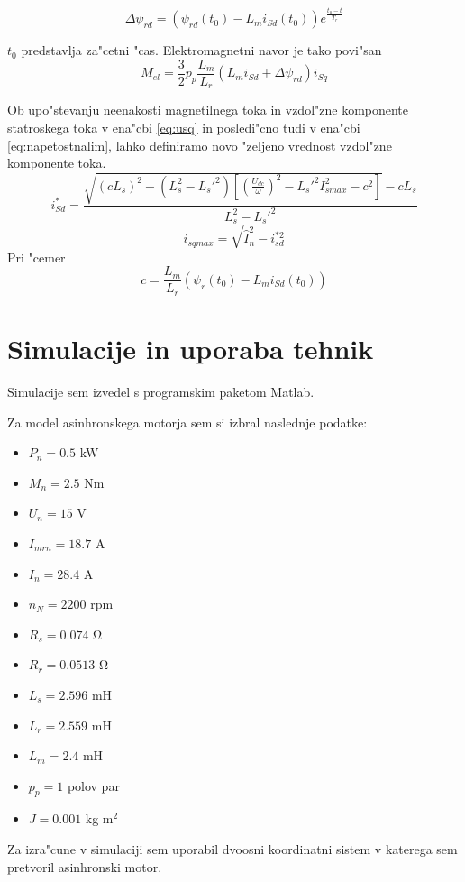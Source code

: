 \documentclass[journal,a4paper,twoside]{sty/IEEEtran}
\begin{document}
 \begin{equation}
\label{eq:delta}
\Delta \psi_{rd}=(\psi_{rd}(t_0)-L_m i_{Sd}(t_0))e^{\frac{t_0-t}{T_r}}
\end{equation}

$t_0$ predstavlja za"cetni "cas. Elektromagnetni navor je tako povi"san
\begin{equation}
\label{navor3}
M_{el}=\frac{3}{2}p_p \frac{L_m}{L_r}(L_m i_{Sd}+\Delta \psi_{rd})i_{Sq}
\end{equation}

Ob upo"stevanju neenakosti magnetilnega toka in vzdol"zne komponente statroskega toka v ena"cbi \ref{eq:usq} in posledi"cno tudi v ena"cbi \ref{eq:napetostnalim}, lahko definiramo novo "zeljeno vrednost vzdol"zne komponente toka.
\begin{equation}
\label{eq:zeljentok2}
i_{Sd}^*=\frac{\sqrt{(c L_s)^2+(L_s^2-L_s'^2)[(\frac{U_{dc}}{\omega})^2-L_s'^2I_{smax}^2-c^2]}-cL_s}{L_s^2-L_s'^2}
\end{equation}
\begin{equation}
i_{sqmax}=\sqrt{\hat{I}_n^2-i_{sd}^{*2}}
\end{equation}
Pri "cemer
$$c=\frac{L_m}{L_r}(\psi_{r}(t_0)-L_m i_{Sd}(t_0))$$


\section{Simulacije in uporaba tehnik}
Simulacije sem izvedel s programskim paketom Matlab. 

Za model asinhronskega motorja sem si izbral naslednje podatke:
\begin{itemize}
\item{$P_n=0.5$ kW}
\item{$M_n = 2.5$ Nm}
\item{$U_n = 15$ V}	
\item{$I_{mrn} = 18.7$ A}
\item{$I_n = 28.4$ A}
\item{$n_N = 2200$ rpm}
\item{$R_s = 0.074$ $\mathrm{\Omega}$}
\item{$R_r = 0.0513$ $\mathrm{\Omega}$}
\item{$L_s = 2.596$ mH}
\item{$L_r = 2.559$ mH}
\item{$L_m = 2.4$ mH}
\item{$p_p = 1$  polov par}
\item{$J = 0.001$ kg $\mathrm{m}^2$}
\end{itemize}
Za izra"cune v simulaciji sem uporabil dvoosni koordinatni sistem v katerega sem pretvoril asinhronski motor.
\end{document}
